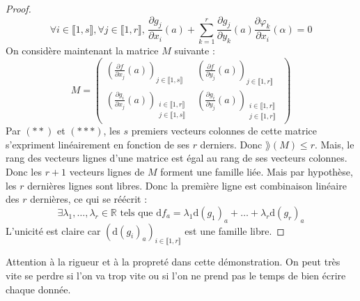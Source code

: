 \begin{proof}
		\[ \forall i \in \llbracket 1, s \rrbracket, \forall j \in \llbracket 1, r \rrbracket, \, \frac{\partial g_j}{\partial x_i}(a) + \sum_{k=1}^r \frac{\partial g_j}{\partial y_k}(a) \frac{\partial \varphi_k}{\partial x_i}(\alpha) = 0 \tag{$***$} \]
		On considère maintenant la matrice $M$ suivante :
		\[ M = \begin{pmatrix}
			\left( \frac{\partial f}{\partial x_j}(a) \right)_{j \in \llbracket 1, s \rrbracket} & \left( \frac{\partial f}{\partial y_j}(a) \right)_{j \in \llbracket 1, r \rrbracket} \\
			\left( \frac{\partial g_i}{\partial x_j}(a) \right)_{\substack{i \in \llbracket 1, r \rrbracket \\ j \in \llbracket 1, s \rrbracket}} & \left( \frac{\partial g_i}{\partial y_j}(a) \right)_{\substack{i \in \llbracket 1, r \rrbracket \\ j \in \llbracket 1, r \rrbracket}}
		\end{pmatrix} \]
		Par $(**)$ et $(***)$, les $s$ premiers vecteurs colonnes de cette matrice s'expriment linéairement en fonction de ses $r$ derniers. Donc $\rang (M) \leq r$. Mais, le rang des vecteurs lignes d'une matrice est égal au rang de ses vecteurs colonnes. Donc les $r+1$ vecteurs lignes de $M$ forment une famille liée. Mais par hypothèse, les $r$ dernières lignes sont libres. Donc la première ligne est combinaison linéaire des $r$ dernières, ce qui se réécrit :
		\[ \exists \lambda_1, \dots, \lambda_r \in \mathbb{R} \text{ tels que } \mathrm{d}f_a = \lambda_1 \mathrm{d}(g_1)_a + \dots + \lambda_r \mathrm{d}(g_r)_a \]
		L'unicité est claire car $(\mathrm{d}(g_i)_a)_{i \in \llbracket 1, r \rrbracket}$ est une famille libre.
	\end{proof}

	\begin{remark}
		Attention à la rigueur et à la propreté dans cette démonstration. On peut très vite se perdre si l'on va trop vite ou si l'on ne prend pas le temps de bien écrire chaque donnée.
	\end{remark}


